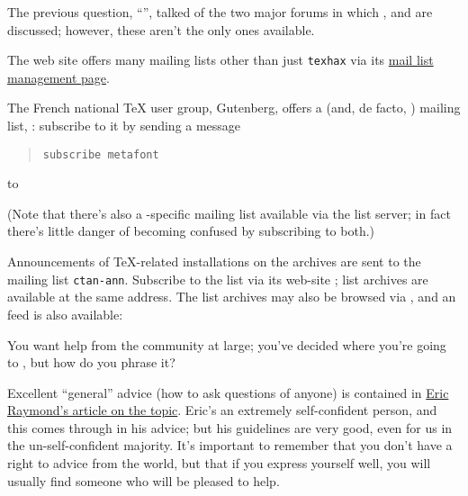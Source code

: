 
The previous question, ``'', talked of
the two major forums in which \AllTeX{}, \MF{} and \MP{} are
discussed; however, these aren't the only ones available.

The  web site offers many mailing lists other than just
\texttt{texhax} via its %
\href{http://tug.org/mailman/listinfo}{mail list management page}.

The French national \TeX{} user group, Gutenberg, offers a \MF{} (and,
de facto, \MP{}) mailing list, : subscribe to
it by sending a message
\begin{quote}
\begin{verbatim}
subscribe metafont
\end{verbatim}
\end{quote}
to 

(Note that there's also a \MP{}-specific mailing list available via the
 list server; in fact there's little danger of becoming confused
by subscribing to both.)

Announcements of \TeX{}-related installations on the 
archives are sent to the mailing list \texttt{ctan-ann}.  Subscribe
to the list via its  web-site
; list archives
are available at the same address.  The list archives may also be
browsed via , and
an  feed is also available:


You want help from the community at large; you've decided where you're
going to , but how do you
phrase it?

Excellent ``general'' advice (how to ask questions of anyone) is
contained in
\href{http://catb.org/~esr/faqs/smart-questions.html}{Eric Raymond's article on the topic}.
Eric's an extremely self-confident person, and this comes through in
his advice; but his guidelines are very good, even for us in the
un-self-confident majority.  It's important to remember that you don't
have a right to advice from the world, but that if you express
yourself well, you will usually find someone who will be pleased to
help.


